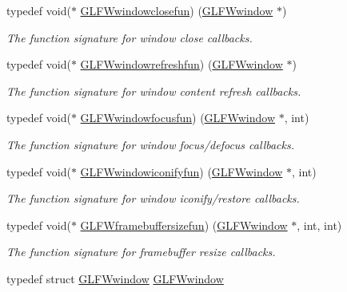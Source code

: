 \begin{DoxyCompactItemize}
typedef void($\ast$ \hyperlink{group__window_ga93e7c2555bd837f4ed8b20f76cada72e}{G\+L\+F\+Wwindowclosefun}) (\hyperlink{group__window_ga3c96d80d363e67d13a41b5d1821f3242}{G\+L\+F\+Wwindow} $\ast$)
\begin{DoxyCompactList}\small\item\em The function signature for window close callbacks. \end{DoxyCompactList}\item 
typedef void($\ast$ \hyperlink{group__window_ga7a56f9e0227e2cd9470d80d919032e08}{G\+L\+F\+Wwindowrefreshfun}) (\hyperlink{group__window_ga3c96d80d363e67d13a41b5d1821f3242}{G\+L\+F\+Wwindow} $\ast$)
\begin{DoxyCompactList}\small\item\em The function signature for window content refresh callbacks. \end{DoxyCompactList}\item 
typedef void($\ast$ \hyperlink{group__window_ga58be2061828dd35080bb438405d3a7e2}{G\+L\+F\+Wwindowfocusfun}) (\hyperlink{group__window_ga3c96d80d363e67d13a41b5d1821f3242}{G\+L\+F\+Wwindow} $\ast$, int)
\begin{DoxyCompactList}\small\item\em The function signature for window focus/defocus callbacks. \end{DoxyCompactList}\item 
typedef void($\ast$ \hyperlink{group__window_gad2d4e4c3d28b1242e742e8268b9528af}{G\+L\+F\+Wwindowiconifyfun}) (\hyperlink{group__window_ga3c96d80d363e67d13a41b5d1821f3242}{G\+L\+F\+Wwindow} $\ast$, int)
\begin{DoxyCompactList}\small\item\em The function signature for window iconify/restore callbacks. \end{DoxyCompactList}\item 
typedef void($\ast$ \hyperlink{group__window_ga3e218ef9ff826129c55a7d5f6971a285}{G\+L\+F\+Wframebuffersizefun}) (\hyperlink{group__window_ga3c96d80d363e67d13a41b5d1821f3242}{G\+L\+F\+Wwindow} $\ast$, int, int)
\begin{DoxyCompactList}\small\item\em The function signature for framebuffer resize callbacks. \end{DoxyCompactList}\item 
typedef struct \hyperlink{group__window_ga3c96d80d363e67d13a41b5d1821f3242}{G\+L\+F\+Wwindow} \hyperlink{group__window_ga3c96d80d363e67d13a41b5d1821f3242}{G\+L\+F\+Wwindow}

\end{DoxyCompactItemize}
